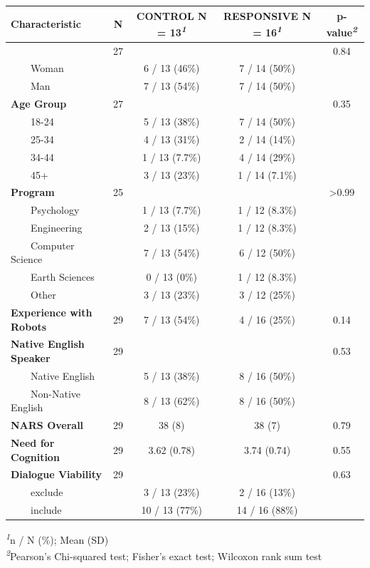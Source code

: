 \documentclass[
]{article}
\begin{document}
\begin{table}
{\fontsize{10.0pt}{12.0pt}\selectfont
\begin{tabular*}{\linewidth}{@{\extracolsep{\fill}}lcccc}
\toprule
\textbf{Characteristic} & \textbf{N} & \textbf{CONTROL}  N = 13\textsuperscript{\textit{1}} & \textbf{RESPONSIVE}  N = 16\textsuperscript{\textit{1}} & \textbf{p-value}\textsuperscript{\textit{2}} \\ 
\midrule\addlinespace[2.5pt]
{\bfseries Gender} & 27 &  &  & 0.84 \\ 
    Woman &  & 6 / 13 (46\%) & 7 / 14 (50\%) &  \\ 
    Man &  & 7 / 13 (54\%) & 7 / 14 (50\%) &  \\ 
{\bfseries Age Group} & 27 &  &  & 0.35 \\ 
    18-24 &  & 5 / 13 (38\%) & 7 / 14 (50\%) &  \\ 
    25-34 &  & 4 / 13 (31\%) & 2 / 14 (14\%) &  \\ 
    34-44 &  & 1 / 13 (7.7\%) & 4 / 14 (29\%) &  \\ 
    45+ &  & 3 / 13 (23\%) & 1 / 14 (7.1\%) &  \\ 
{\bfseries Program} & 25 &  &  & >0.99 \\ 
    Psychology &  & 1 / 13 (7.7\%) & 1 / 12 (8.3\%) &  \\ 
    Engineering &  & 2 / 13 (15\%) & 1 / 12 (8.3\%) &  \\ 
    Computer Science &  & 7 / 13 (54\%) & 6 / 12 (50\%) &  \\ 
    Earth Sciences &  & 0 / 13 (0\%) & 1 / 12 (8.3\%) &  \\ 
    Other &  & 3 / 13 (23\%) & 3 / 12 (25\%) &  \\ 
{\bfseries Experience with Robots} & 29 & 7 / 13 (54\%) & 4 / 16 (25\%) & 0.14 \\ 
{\bfseries Native English Speaker} & 29 &  &  & 0.53 \\ 
    Native English &  & 5 / 13 (38\%) & 8 / 16 (50\%) &  \\ 
    Non-Native English &  & 8 / 13 (62\%) & 8 / 16 (50\%) &  \\ 
{\bfseries NARS Overall} & 29 & 38 (8) & 38 (7) & 0.79 \\ 
{\bfseries Need for Cognition} & 29 & 3.62 (0.78) & 3.74 (0.74) & 0.55 \\ 
{\bfseries Dialogue Viability} & 29 &  &  & 0.63 \\ 
    exclude &  & 3 / 13 (23\%) & 2 / 16 (13\%) &  \\ 
    include &  & 10 / 13 (77\%) & 14 / 16 (88\%) &  \\ 
\bottomrule
\end{tabular*}
\begin{minipage}{\linewidth}
\textsuperscript{\textit{1}}n / N (\%); Mean (SD)\\
\textsuperscript{\textit{2}}Pearson's Chi-squared test; Fisher's exact test; Wilcoxon rank sum test\\
\end{minipage}

}

\end{table}%
\end{document}
